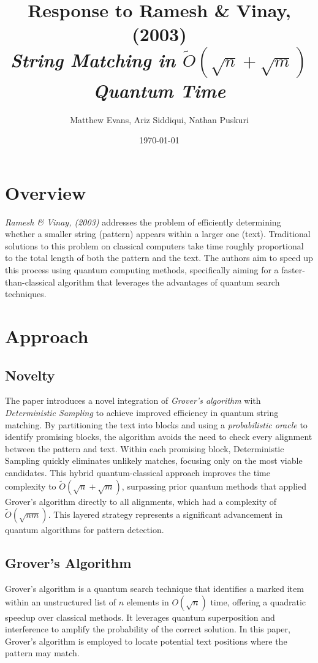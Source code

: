 \documentclass[12pt]{article}
\title{\Large{Response to Ramesh \& Vinay, (2003)\\ \small{\textit{String Matching in \(\tilde{O}(\sqrt{n} + \sqrt{m})\) Quantum Time}} }}
\author{%
\normalsize{Matthew Evans, Ariz Siddiqui, Nathan Puskuri}
}
\date{\today}
\begin{document}
\maketitle

\section*{Overview}
\textit{Ramesh \& Vinay, (2003)}\cite{RameshH2003SmiO} addresses the problem of efficiently determining whether a smaller string (pattern) appears within a larger one (text). Traditional solutions to this problem on classical computers take time roughly proportional to the total length of both the pattern and the text. The authors aim to speed up this process using quantum computing methods, specifically aiming for a faster-than-classical algorithm that leverages the advantages of quantum search techniques.

\section*{Approach}
\subsection*{Novelty}
The paper introduces a novel integration of \textit{Grover's algorithm} with \textit{Deterministic Sampling} to achieve improved efficiency in quantum string matching. By partitioning the text into blocks and using a \textit{probabilistic oracle} to identify promising blocks, the algorithm avoids the need to check every alignment between the pattern and text. Within each promising block, Deterministic Sampling quickly eliminates unlikely matches, focusing only on the most viable candidates. This hybrid quantum-classical approach improves the time complexity to \(\tilde{O}(\sqrt{n} + \sqrt{m})\), surpassing prior quantum methods that applied Grover's algorithm directly to all alignments, which had a complexity of \(\tilde{O}(\sqrt{n m})\). This layered strategy represents a significant advancement in quantum algorithms for pattern detection.

\subsection*{Grover's Algorithm}
Grover's algorithm is a quantum search technique that identifies a marked item within an unstructured list of \(n\) elements in \(O(\sqrt{n})\) time, offering a quadratic speedup over classical methods. It leverages quantum superposition and interference to amplify the probability of the correct solution. In this paper, Grover's algorithm is employed to locate potential text positions where the pattern may match.
\end{document}
